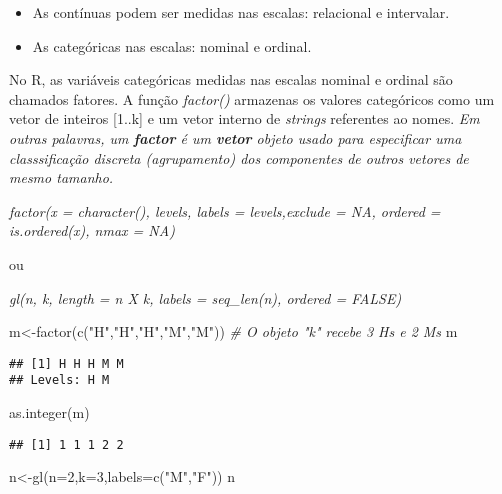 \documentclass[
]{book}
\newenvironment{Shaded}{\begin{snugshade}}{\end{snugshade}}
\newcommand{\AttributeTok}[1]{\textcolor[rgb]{0.77,0.63,0.00}{#1}}
\newcommand{\CommentTok}[1]{\textcolor[rgb]{0.56,0.35,0.01}{\textit{#1}}}
\newcommand{\DecValTok}[1]{\textcolor[rgb]{0.00,0.00,0.81}{#1}}
\newcommand{\FunctionTok}[1]{\textcolor[rgb]{0.00,0.00,0.00}{#1}}
\newcommand{\NormalTok}[1]{#1}
\newcommand{\OtherTok}[1]{\textcolor[rgb]{0.56,0.35,0.01}{#1}}
\newcommand{\StringTok}[1]{\textcolor[rgb]{0.31,0.60,0.02}{#1}}
\providecommand{\tightlist}{%
  \setlength{\itemsep}{0pt}\setlength{\parskip}{0pt}}
\begin{document}
\begin{itemize}
\tightlist
\item
  As contínuas podem ser medidas nas escalas: relacional e intervalar.
\item
  As categóricas nas escalas: nominal e ordinal.
\end{itemize}

No R, as variáveis categóricas medidas nas escalas nominal e ordinal são chamados fatores.
A função \emph{factor()} armazenas os valores categóricos como um vetor de inteiros {[}1..k{]} e um vetor interno de \emph{strings} referentes ao nomes.
\emph{Em outras palavras, um \textbf{factor} é um \textbf{vetor} objeto usado para especificar uma classsificação discreta (agrupamento) dos componentes de outros vetores de mesmo tamanho.}

\emph{\emph{factor(x = character(), levels, labels = levels,exclude = NA, ordered = is.ordered(x), nmax = NA)}}

ou

\emph{\emph{gl(n, k, length = n X k, labels = seq\_len(n), ordered = FALSE)}}

\begin{Shaded}
\begin{Highlighting}[]
\NormalTok{m}\OtherTok{\textless{}{-}}\FunctionTok{factor}\NormalTok{(}\FunctionTok{c}\NormalTok{(}\StringTok{"H"}\NormalTok{,}\StringTok{"H"}\NormalTok{,}\StringTok{"H"}\NormalTok{,}\StringTok{"M"}\NormalTok{,}\StringTok{"M"}\NormalTok{)) }\CommentTok{\# O objeto "k" recebe 3 H\textquotesingle{}s e 2 M\textquotesingle{}s}
\NormalTok{m}
\end{Highlighting}
\end{Shaded}

\begin{verbatim}
## [1] H H H M M
## Levels: H M
\end{verbatim}

\begin{Shaded}
\begin{Highlighting}[]
\FunctionTok{as.integer}\NormalTok{(m)}
\end{Highlighting}
\end{Shaded}

\begin{verbatim}
## [1] 1 1 1 2 2
\end{verbatim}

\begin{Shaded}
\begin{Highlighting}[]
\NormalTok{n}\OtherTok{\textless{}{-}}\FunctionTok{gl}\NormalTok{(}\AttributeTok{n=}\DecValTok{2}\NormalTok{,}\AttributeTok{k=}\DecValTok{3}\NormalTok{,}\AttributeTok{labels=}\FunctionTok{c}\NormalTok{(}\StringTok{"M"}\NormalTok{,}\StringTok{"F"}\NormalTok{)) }
\NormalTok{n}
\end{Highlighting}
\end{Shaded}
\end{document}
